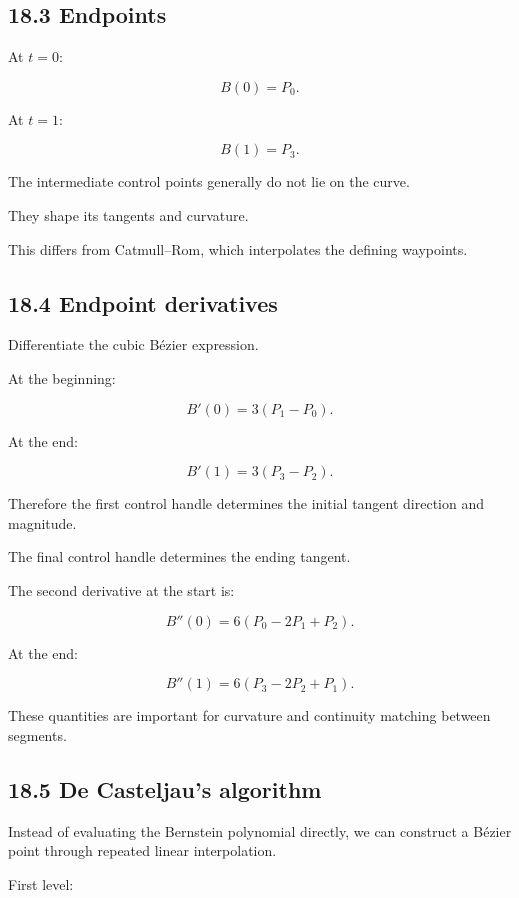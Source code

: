 \subsection{18.3 Endpoints}\label{02-foundations-ii-ch028-endpoints}

At \(t=0\):

\[ B(0)=P_0. \]

At \(t=1\):

\[ B(1)=P_3. \]

The intermediate control points generally do not lie on the curve.

They shape its tangents and curvature.

This differs from Catmull--Rom, which interpolates the defining waypoints.

\subsection{18.4 Endpoint derivatives}\label{02-foundations-ii-ch028-endpoint-derivatives}

Differentiate the cubic Bézier expression.

At the beginning:

\[ \boxed{ B'(0)=3(P_1-P_0) }. \]

At the end:

\[ \boxed{ B'(1)=3(P_3-P_2) }. \]

Therefore the first control handle determines the initial tangent direction and magnitude.

The final control handle determines the ending tangent.

The second derivative at the start is:

\[ \boxed{ B''(0)=6(P_0-2P_1+P_2) }. \]

At the end:

\[ \boxed{ B''(1)=6(P_3-2P_2+P_1) }. \]

These quantities are important for curvature and continuity matching between segments.

\subsection{18.5 De Casteljau's algorithm}\label{02-foundations-ii-ch028-de-casteljaus-algorithm}

Instead of evaluating the Bernstein polynomial directly, we can construct a Bézier point through repeated linear interpolation.

First level:

